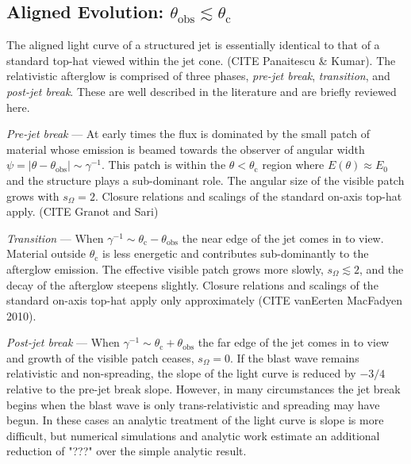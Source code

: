 \documentclass[twocolumn]{aastex62}
\newcommand{\thobs}{\ensuremath{\theta_{\mathrm{obs}}}}
\newcommand{\thC}{\ensuremath{\theta_{\mathrm{c}}}}
\newcommand{\som}{\ensuremath{s_{\Omega}}}
\begin{document}
\subsection{Aligned Evolution: $\thobs \lesssim \thC$} \label{subsec:aligned}

The aligned light curve of a structured jet is essentially identical to that of a standard top-hat viewed within the jet cone. (CITE Panaitescu \& Kumar).  The relativistic afterglow is comprised of three phases, \emph{pre-jet break}, \emph{transition}, and \emph{post-jet break}.  These are well described in the literature and are briefly reviewed here.

\emph{Pre-jet break} ---  At early times the flux is dominated by the small patch of material whose emission is beamed towards the observer of angular width $\psi = |\theta-\thobs| \sim \gamma^{-1}$.  This patch is within the $\theta < \thC$ region where $E(\theta) \approx E_0$ and the structure plays a sub-dominant role.  The angular size of the visible patch grows with $\som = 2$.  Closure relations and scalings of the standard on-axis top-hat apply. (CITE Granot and Sari)

\emph{Transition} ---  When $\gamma^{-1} \sim \thC-\thobs$ the near edge of the jet comes in to view.  Material outside $\thC$ is less energetic and contributes sub-dominantly to the afterglow emission.  The effective visible patch grows more slowly, $\som \lesssim 2$, and the decay of the afterglow steepens slightly. Closure relations and scalings of the standard on-axis top-hat apply only approximately (CITE vanEerten MacFadyen 2010).  

\emph{Post-jet break} ---  When $\gamma^{-1} \sim \thC+\thobs$ the far edge of the jet comes in to view and growth of the visible patch ceases, $\som = 0$.  If the blast wave remains relativistic and non-spreading, the slope of the light curve is reduced by $-3/4$ relative to the pre-jet break slope.  However, in many circumstances the jet break begins when the blast wave is only trans-relativistic and spreading may have begun.  In these cases an analytic treatment of the light curve is slope is more difficult, but numerical simulations and analytic work estimate an additional reduction of "???" over the simple analytic result.
\end{document}
